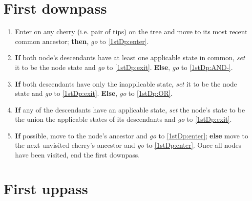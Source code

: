 \documentclass[a4paper,12pt]{article}
\begin{document}

\section{First downpass} \label{1stDp}



\begin{enumerate}
    \item Enter on any cherry (i.e. pair of tips) on the tree and move to its most recent common ancestor; \textbf{then}, \textit{go} to \ref{1stDp:enter}.
    \item \label{1stDp:enter} \textbf{If} both node's descendants have at least one applicable state in common, \textit{set} it to be the node state and \textit{go} to \ref{1stDp:exit}. \textbf{Else}, \textit{go} to \ref{1stDp:AND-}.
    \item \label{1stDp:AND-} \textbf{If} both descendants have only the inapplicable state, \textit{set} it to be the node state and \textit{go} to \ref{1stDp:exit}. \textbf{Else}, \textit{go} to \ref{1stDp:OR}.
    \item \label{1stDp:OR} \textbf{If} any of the descendants have an applicable state, \textit{set} the node's state to be the union the applicable states of its descendants and \textit{go} to \ref{1stDp:exit}.
    \item \label{1stDp:exit} \textbf{If} possible, move to the node's ancestor and \textit{go} to \ref{1stDp:enter}; \textbf{else} move to the next unvisited cherry's ancestor and \textit{go} to \ref{1stDp:enter}. Once all nodes have been visited, end the first downpass.
\end{enumerate}

\section{First uppass} \label{1stUp}
\end{document}
